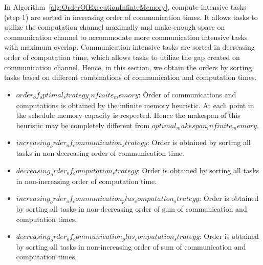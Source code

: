 \documentclass[runningheads]{llncs} %
\begin{document}
In Algorithm~\ref{alg:OrderOfExecutionInfinteMemory}, compute intensive tasks (step 1) are sorted in increasing order of communication times. It allows tasks to utilize the computation channel maximally and make enough space on communication channel to accommodate more communication intensive tasks with maximum overlap. Communication intensive tasks are sorted in decreasing order of computation time, which allows tasks to utilize the gap created on communication channel. Hence,  in this section, we obtain the orders by sorting tasks based on different combinations of communication and computation times.

\begin{itemize}[a)]
	\item $order_of_optimal_strategy_infinite_memory $: Order of communications and computations is obtained by the infinite memory heuristic. At each point in the schedule memory capacity is respected. Hence the makespan of this heuristic may be completely different from $optimal_makespan_infinite_memory$.
	
	\item $increasing_order_of_communication_strategy$: Order is obtained by sorting all tasks in non-decreasing order of communication time. 
	
	\item $decreasing_order_of_computation_strategy$: Order is obtained by sorting all tasks in non-increasing order of computation time. 
	\item $increasing_order_of_communication_plus_computation_strategy$: Order is obtained by sorting all tasks in non-decreasing order of sum of communication and computation times.
	\item $decreasing_order_of_communication_plus_computation_strategy$: Order is obtained by sorting all tasks in non-increasing order of sum of communication and computation times.
	
\end{itemize}
\end{document}

